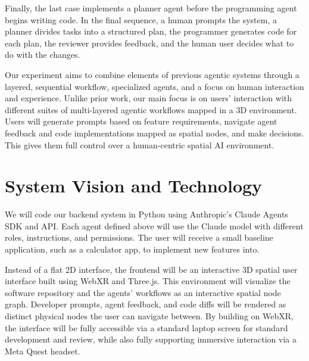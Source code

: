 \documentclass{chi-ext}
\begin{document}
Finally, the last case implements a planner agent before the programming agent begins writing code. In the final sequence, a human prompts the system, a planner divides tasks into a structured plan, the programmer generates code for each plan, the reviewer provides feedback, and the human user decides what to do with the changes.

Our experiment aims to combine elements of previous agentic systems through a layered, sequential workflow, specialized agents, and a focus on human interaction and experience. Unlike prior work, our main focus is on users' interaction with different suites of multi-layered agentic workflows mapped in a 3D environment. Users will generate prompts based on feature requirements, navigate agent feedback and code implementations mapped as spatial nodes, and make decisions. This gives them full control over a human-centric spatial AI environment.

\section{System Vision and Technology}
We will code our backend system in Python using Anthropic's Claude Agents SDK and API. Each agent defined above will use the Claude model with different roles, instructions, and permissions. The user will receive a small baseline application, such as a calculator app, to implement new features into. 

Instead of a flat 2D interface, the frontend will be an interactive 3D spatial user interface built using WebXR and Three.js. This environment will visualize the software repository and the agents' workflows as an interactive spatial node graph. Developer prompts, agent feedback, and code diffs will be rendered as distinct physical nodes the user can navigate between. By building on WebXR, the interface will be fully accessible via a standard laptop screen for standard development and review, while also fully supporting immersive interaction via a Meta Quest headset.

\end{document}
